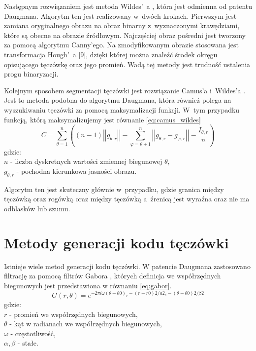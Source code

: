 Następnym rozwiązaniem jest metoda Wildes'~a \cite{Wildes}, która jest odmienna od patentu Daugmana. Algorytm ten jest realizowany w~dwóch krokach. Pierwszym jest zamiana oryginalnego obrazu na obraz binarny z~wyznaczonymi krawędziami, które są obecne na obrazie źródłowym. Najczęściej obraz pośredni jest tworzony za pomocą algorytmu Canny'ego. Na zmodyfikowanym obrazie stosowana jest transformacja Hough'~a [9], dzięki której można znaleźć środek okręgu opisującego tęczówkę oraz jego promień. Wadą tej metody jest trudność ustalenia progu binaryzacji.

Kolejnym sposobem segmentacji tęczówki jest rozwiązanie Camus'a i~Wildes'a \cite{Camus}. Jest to metoda podobna do algorytmu Daugmana, która również polega na wyszukiwaniu tęczówki za pomocą maksymalizacji funkcji. W~tym przypadku funkcją, którą maksymalizujemy jest równanie \ref{eq:camus_wildes} 
\begin{equation}
\label{eq:camus_wildes}
C=\sum_{\theta =1}^{n} ((n-1)\left|\left| g_{\theta,r} \right|\right| - \sum_{\varphi=\theta + 1 } ^{n} \left| \left| g_{\theta,r} - g_{\varphi,r} \right| \right| - \frac{I_{\theta,r}}{n}  )
\end{equation}
gdzie:\\
$ n $ - liczba dyskretnych wartości zmiennej biegunowej $ \theta $, \\
$ g_{\theta, r} $ - pochodna kierunkowa jasności obrazu.

Algorytm ten jest skuteczny głównie w~przypadku, gdzie granica między tęczówką oraz rogówką oraz między tęczówką a~źrenicą jest wyraźna oraz nie ma odblasków lub szumu.

\section{Metody generacji kodu tęczówki}
\label{sec:metodyGeneracjiKodu}

Istnieje wiele metod generacji kodu tęczówki. W patencie Daugmana zastosowano filtrację za pomocą filtrów Gabora \cite{Daugman}, których definicja we współrzędnych biegunowych jest przedstawiona w równaniu \ref{eq:gabor}.
\begin{equation}
\label{eq:gabor}
G(r,\theta) = e^{-2\pi i\omega (\theta - \theta 0)_{e}-(r - r0)2/a2_{e}-(\theta-\theta 0 )2/\beta 2}
\end{equation}
gdzie:\\
$r$ - promień we współrzędnych biegunowych, \\
$\theta$ - kąt w radianach we współrzędnych biegunowych, \\
$ \omega $ - częstotliwość, \\
$ \alpha, \beta $ - stałe.


